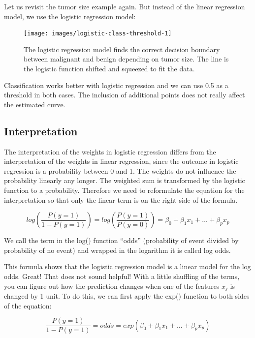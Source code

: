 \documentclass[
  12pt,
]{krantz}
\begin{document}
Let us revisit the tumor size example again.
But instead of the linear regression model, we use the logistic regression model:

\begin{figure}

{\centering \texttt{[image: images/logistic-class-threshold-1]} 

}

\caption{The logistic regression model finds the correct decision boundary between malignant and benign depending on tumor size. The line is the logistic function shifted and squeezed to fit the data.}\label{fig:logistic-class-threshold}
\end{figure}

Classification works better with logistic regression and we can use 0.5 as a threshold in both cases. The inclusion of additional points does not really affect the estimated curve.

\hypertarget{interpretation-1}{%
\subsection{Interpretation}\label{interpretation-1}}

The interpretation of the weights in logistic regression differs from the interpretation of the weights in linear regression, since the outcome in logistic regression is a probability between 0 and 1.
The weights do not influence the probability linearly any longer.
The weighted sum is transformed by the logistic function to a probability.
Therefore we need to reformulate the equation for the interpretation so that only the linear term is on the right side of the formula.

\[log\left(\frac{P(y=1)}{1-P(y=1)}\right)=log\left(\frac{P(y=1)}{P(y=0)}\right)=\beta_{0}+\beta_{1}x_{1}+\ldots+\beta_{p}x_{p}\]

We call the term in the log() function ``odds'' (probability of event divided by probability of no event) and wrapped in the logarithm it is called log odds.

This formula shows that the logistic regression model is a linear model for the log odds.
Great!
That does not sound helpful!
With a little shuffling of the terms, you can figure out how the prediction changes when one of the features \(x_j\) is changed by 1 unit.
To do this, we can first apply the exp() function to both sides of the equation:

\[\frac{P(y=1)}{1-P(y=1)}=odds=exp\left(\beta_{0}+\beta_{1}x_{1}+\ldots+\beta_{p}x_{p}\right)\]
\end{document}
